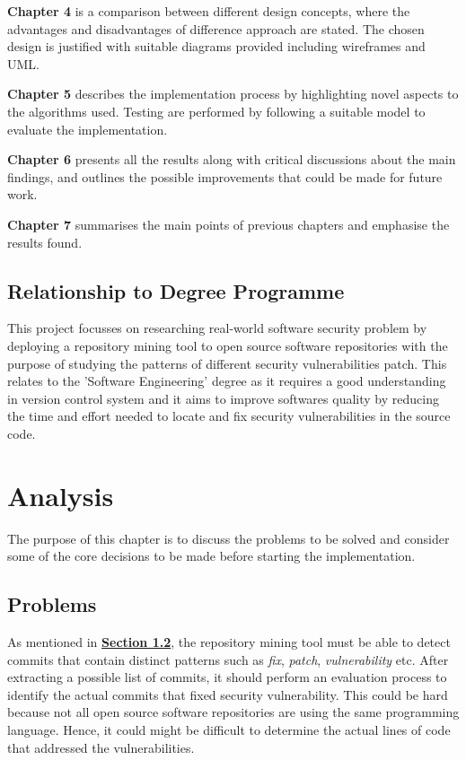 \documentclass[12pt, a4paper]{report}
\begin{document}
\noindent\textbf{Chapter 4} is a comparison between different design concepts, where the advantages and disadvantages of difference approach are stated. The chosen design is justified with suitable diagrams provided including wireframes and UML.

\noindent\textbf{Chapter 5} describes the implementation process by highlighting novel aspects to the algorithms used. Testing are performed by following a suitable model to evaluate the implementation.

\noindent\textbf{Chapter 6} presents all the results along with critical discussions about the main findings,	and outlines the possible improvements that could be made for future work.

\noindent\textbf{Chapter 7} summarises the main points of previous chapters and emphasise the results found.

\section{Relationship to Degree Programme}
This project focusses on researching real-world software security problem by deploying a repository mining tool to open source software repositories with the purpose of studying the patterns of different security vulnerabilities patch. This relates to the 'Software Engineering' degree as it requires a good understanding in version control system and it aims to improve softwares quality by reducing the time and effort needed to locate and fix security vulnerabilities in the source code.

\chapter{Analysis} %
The purpose of this chapter is to discuss the problems to be solved and consider some of the core decisions to be made before starting the implementation.

\section{Problems}
As mentioned in \hyperref[sec:objectives]{\textbf{Section 1.2}}, the repository mining tool must be able to detect commits that contain distinct patterns such as \textit{fix}, \textit{patch}, \textit{vulnerability} etc. After extracting a possible list of commits, it should perform an evaluation process to identify the actual commits that fixed security vulnerability.	This could be hard because not all open source software repositories are using the same programming language. Hence, it could might be difficult to determine the actual lines of code that addressed the vulnerabilities.
\end{document}
